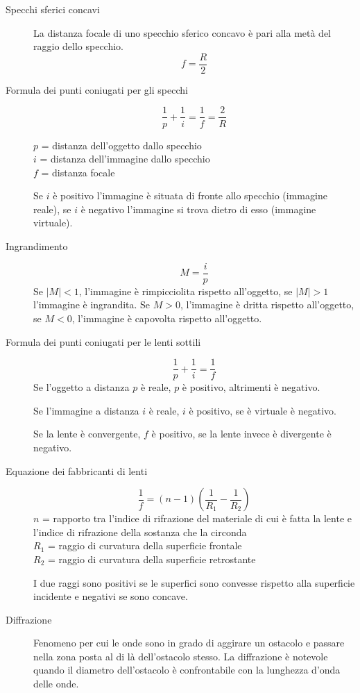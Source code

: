 \documentclass[a4paper,11pt,italian]{article}
\begin{document}
\begin{description}
  \item[Specchi sferici concavi] 
  La distanza focale di uno specchio sferico concavo è pari alla metà del raggio dello specchio.
  \[ f = \frac{R}{2} \]
  
  \item[Formula dei punti coniugati per gli specchi]
  \[ \frac{1}{p} +\frac{1}{i} = \frac{1}{f} = \frac{2}{R} \]
  \begin{multicols}{2}
  $ p $ = distanza dell'oggetto dallo specchio\\
  $ i $ = distanza dell'immagine dallo specchio\\
  $ f $ = distanza focale
  \end{multicols}
  Se $ i $ è positivo l'immagine è situata di fronte allo specchio (immagine reale), se $ i $ è negativo l'immagine si trova dietro di esso (immagine virtuale).
  
  \item[Ingrandimento]
  \[ M = \frac{i}{p} \]
  Se $ |M| < 1$, l'immagine è rimpicciolita rispetto all'oggetto, se $ |M| >1 $ l'immagine è ingrandita. Se $ M > 0 $, l'immagine è dritta rispetto all'oggetto, se $ M<0 $, l'immagine è capovolta rispetto all'oggetto.
  
  \item[Formula dei punti coniugati per le lenti sottili]
  \[ \frac{1}{p} +\frac{1}{i} = \frac{1}{f} \]
  Se l'oggetto a distanza $ p $ è reale, $ p $ è positivo, altrimenti è negativo.
  
  Se l'immagine a distanza $ i $ è reale, $ i $ è positivo, se è virtuale è negativo.
  
  Se la lente è convergente, $ f $ è positivo, se la lente invece è divergente è negativo.

  \item[Equazione dei fabbricanti di lenti]
  \[ \frac{1}{f} = (n-1) \left( \frac{1}{R_1} - \frac{1}{R_2} \right) \]
  $ n $ = rapporto tra l'indice di rifrazione del materiale di cui è fatta la lente e l'indice di rifrazione della sostanza che la circonda\\
  $ R_1 $ = raggio di curvatura della superficie frontale\\
  $ R_2 $ = raggio di curvatura della superficie retrostante
  
  I due raggi sono positivi se le superfici sono convesse rispetto alla superficie incidente e negativi se sono concave.
  
  \item[Diffrazione] 
  Fenomeno per cui le onde sono in grado di aggirare un ostacolo e passare nella zona posta al di là dell'ostacolo stesso. La diffrazione è notevole quando il diametro dell'ostacolo è confrontabile con la lunghezza d'onda delle onde.
  

\end{description}
\end{document}
